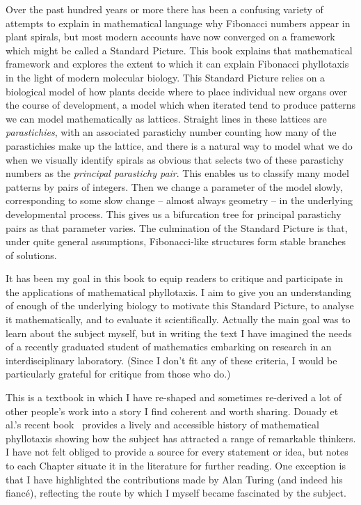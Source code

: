 

\preface


Over the past hundred years or more there has been a confusing variety of attempts to explain in mathematical language why Fibonacci numbers appear in plant spirals, but most modern accounts have now converged on a framework which might be called a Standard Picture. This book explains that mathematical framework and explores the extent to which it can explain Fibonacci phyllotaxis in the light of modern molecular biology.
 This Standard Picture relies on a biological model of how plants decide where to place individual new  organs over the course of development,
a model which when iterated tend to produce patterns we can model mathematically as lattices. Straight lines in these lattices are \textit{parastichies}, with an associated parastichy number counting how many of the parastichies make up the lattice, and there is a natural way to model what we do when we visually identify spirals as obvious that selects two of these parastichy numbers as the \textit{principal parastichy pair}.  This enables us to classify many model patterns by pairs of integers. Then we change a parameter of the model slowly, corresponding to some slow change -- almost always geometry -- in the underlying developmental process. This gives us a bifurcation tree for principal parastichy pairs as that parameter varies. The culmination of the Standard Picture is that, under quite general assumptions, Fibonacci-like structures form  stable branches of solutions.

It has been my goal in this book to equip readers to critique and participate in the applications of mathematical phyllotaxis.  I aim to give you an understanding of enough of the underlying biology to motivate this Standard Picture, to analyse it mathematically, and to evaluate it scientifically. Actually the main goal was to learn about the subject myself, but in writing the text I have imagined the needs of a recently graduated student of mathematics embarking on research in an interdisciplinary laboratory. (Since I don't fit any of these criteria, I would be particularly grateful for critique from those who do.) 

This is a textbook in which I have re-shaped and sometimes  re-derived a lot of other people's work into a story I find coherent and worth sharing. Douady et al.'s recent book~\cite{douadyPlantsKnowMath2024} provides a lively and accessible history of mathematical phyllotaxis showing how the subject has attracted a range of remarkable thinkers.  I have not felt obliged to provide a source for every statement or idea, but notes to each Chapter situate it in the literature for further reading. One exception is that I have highlighted the 
contributions made by Alan Turing (and indeed his fianc\'e), reflecting the route by which I myself became fascinated by the subject.

